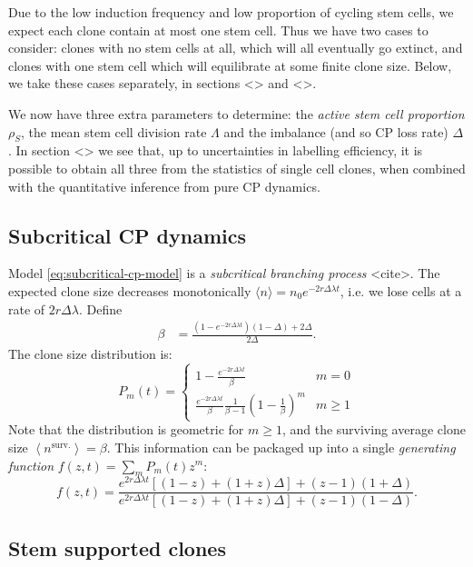 \documentclass[10pt,UKenglish]{article}
\begin{document}
Due to the low induction frequency and low proportion of cycling stem cells, we expect each clone contain at most one stem cell. Thus we have two cases to consider: clones with no stem cells at all, which will all eventually go extinct, and clones with one stem cell which will equilibrate at some finite clone size. Below, we take these cases separately, in sections <> and <>.

We now have three extra parameters to determine: the \emph{active stem cell proportion} $\rho_S$, the mean stem cell division rate $\Lambda$ and the imbalance (and so CP loss rate) $\Delta$. In section <> we see that, up to uncertainties in labelling efficiency, it is possible to obtain all three from the statistics of single cell clones, when combined with the quantitative inference from pure CP dynamics. 

\subsection{Subcritical CP dynamics}

Model \ref{eq:subcritical-cp-model} is a \emph{subcritical branching process} <cite>. The expected clone size decreases monotonically $\langle n \rangle = n_0 e^{-2 r \Delta \lambda t}$, i.e. we lose cells at a rate of $2 r \Delta \lambda$. Define
\begin{align*}
\beta &= \frac{\left(1-e^{-2 r \Delta \lambda t}\right)(1-\Delta)+2\Delta}{2\Delta}.
\end{align*}
The clone size distribution is:
\begin{equation*}
P_m(t) = \begin{cases}
1 - \frac{e^{-2 r \Delta \lambda t}}{\beta} & m=0 \\
\frac{e^{-2 r \Delta \lambda t}}{\beta} \frac{1}{\beta-1} \left(1-\frac{1}{\beta}\right)^m & m\ge1
\end{cases}
\end{equation*}
Note that the distribution is geometric for $m \ge 1$, and the surviving average clone size $\left\langle n^\textrm{surv.} \right\rangle = \beta$. This information can be packaged up into a single \emph{generating function} $f(z,t) = \sum_m P_m(t) z^m$:
\begin{equation*}
f(z,t) = \frac{e^{2 r \Delta \lambda t}\left[(1-z) + (1+z)\Delta\right] + (z-1)(1+\Delta)}{e^{2 r \Delta \lambda t}\left[(1-z) + (1+z)\Delta\right] + (z-1)(1-\Delta)}.
\end{equation*}

\subsection{\label{sec:subcritical-immigration}Stem supported clones}
\end{document}
